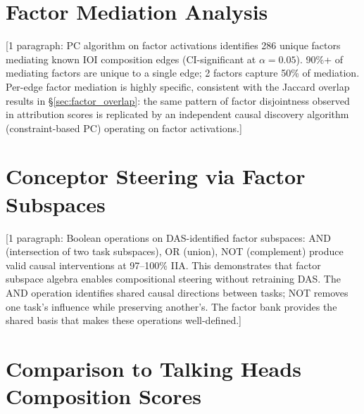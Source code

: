 \documentclass[11pt]{article}
\begin{document}

\section{Factor Mediation Analysis}
\label{app:mediation}


[1 paragraph: PC algorithm on factor activations identifies 286 unique
factors mediating known IOI composition edges (CI-significant at
$\alpha = 0.05$). 90\%+ of mediating factors are unique to a single
edge; 2 factors capture 50\% of mediation. Per-edge factor mediation
is highly specific, consistent with the Jaccard overlap results in
\S\ref{sec:factor_overlap}: the same pattern of factor disjointness
observed in attribution scores is replicated by an independent causal
discovery algorithm (constraint-based PC) operating on factor
activations.]



\section{Conceptor Steering via Factor Subspaces}
\label{app:conceptor}


[1 paragraph: Boolean operations on DAS-identified factor subspaces:
AND (intersection of two task subspaces), OR (union), NOT (complement)
produce valid causal interventions at 97--100\% IIA. This demonstrates
that factor subspace algebra enables compositional steering without
retraining DAS. The AND operation identifies shared causal directions
between tasks; NOT removes one task's influence while preserving
another's. The factor bank provides the shared basis that makes these
operations well-defined.]



\section{Comparison to Talking Heads Composition Scores}
\label{app:merullo}
\end{document}

